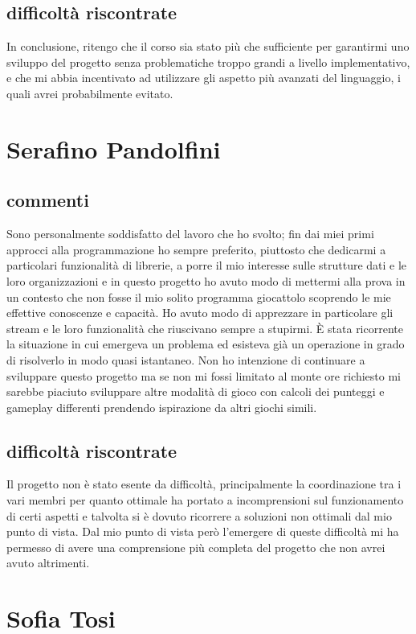 \documentclass[a4paper,12pt]{report}
\begin{document}
\subsection{difficoltà riscontrate}
In conclusione, ritengo che il corso sia stato più che sufficiente per garantirmi uno sviluppo del progetto senza problematiche troppo grandi a livello implementativo, e che mi abbia incentivato ad utilizzare gli aspetto più avanzati del linguaggio, i quali avrei probabilmente evitato.
\newpage
\section{Serafino Pandolfini}
\subsection{commenti}
Sono personalmente soddisfatto del lavoro che ho svolto; fin dai miei primi approcci alla programmazione ho sempre preferito, piuttosto che dedicarmi a particolari funzionalità di librerie, a porre il mio interesse sulle strutture dati e le loro organizzazioni e in questo progetto ho avuto modo di mettermi alla prova in un contesto che non fosse il mio solito programma giocattolo scoprendo le mie effettive conoscenze e capacità. Ho avuto modo di apprezzare in particolare gli stream e le loro funzionalità che riuscivano sempre a stupirmi. È stata ricorrente la situazione in cui emergeva un problema ed esisteva già un operazione in grado di risolverlo in modo quasi istantaneo.
Non ho intenzione di continuare a sviluppare questo progetto ma se non mi fossi limitato al monte ore richiesto mi sarebbe piaciuto sviluppare altre modalità di gioco con calcoli dei punteggi e gameplay differenti prendendo ispirazione da altri giochi simili. 
\subsection{difficoltà riscontrate}
Il progetto non è stato esente da difficoltà, principalmente la coordinazione tra i vari membri per quanto ottimale ha portato a incomprensioni sul funzionamento di certi aspetti e talvolta si è dovuto ricorrere a soluzioni non ottimali dal mio punto di vista. Dal mio punto di vista però l'emergere di queste difficoltà mi ha permesso di avere una comprensione più completa del progetto che non avrei avuto altrimenti.
\newpage
\section{Sofia Tosi}
\end{document}
